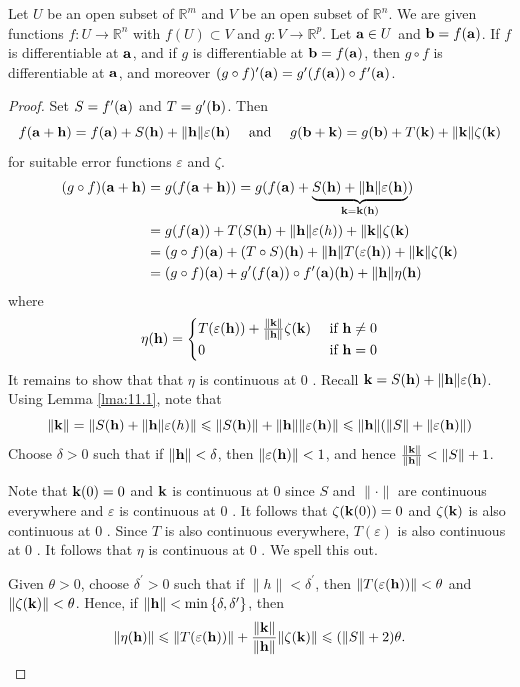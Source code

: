 \documentclass[a4paper,11pt]{article}
\begin{document}
\begin{proposition}
    Let $U$ be an open subset of $\mathbb{R}^{m}$ and $V$ be an open subset of $\mathbb{R}^{n}$. We are given functions $f: U \rightarrow \mathbb{R}^{n}$ with $f(U) \subset V$ and $g: V \rightarrow \mathbb{R}^{p}$. Let ${\bf a} \in U$ and ${\bf b}=f({\bf a})$. If $f$ is differentiable at ${\bf a}$, and if $g$ is differentiable at ${\bf b}=f({\bf a})$, then $g \circ f$ is differentiable at ${\bf a}$, and moreover $(g \circ f)^{\prime}({\bf a})=g^{\prime}(f({\bf a})) \circ f^{\prime}({\bf a})$.
\end{proposition}
\begin{proof}
    Set $S=f^{\prime}({\bf a})$ and $T=g^{\prime}({\bf b})$. Then
$$
f({\bf a}+{\bf h})=f({\bf a})+S({\bf h})+\|{\bf h}\| \varepsilon({\bf h}) \quad \text { and } \quad g({\bf b}+{\bf k})=g({\bf b})+T({\bf k})+\|{\bf k}\| \zeta({\bf k})
$$
for suitable error functions $\varepsilon$ and $\zeta$.
\begin{align*}
    (g \circ f)({\bf a}+{\bf h}) &=g(f({\bf a}+{\bf h}))=g(f({\bf a})+\underbrace{S({\bf h})+\|{\bf h}\| \varepsilon({\bf h})}_{{\bf k}={\bf k}({\bf h})}) \\
    &=g(f({\bf a}))+T(S({\bf h})+\|{\bf h}\| \varepsilon(h))+\|{\bf k}\| \zeta({\bf k}) \\
    &=(g \circ f)({\bf a})+(T \circ S)({\bf h})+\|{\bf h}\| T(\varepsilon({\bf h}))+\|{\bf k}\| \zeta({\bf k}) \\
    &=(g \circ f)({\bf a})+g^{\prime}(f({\bf a})) \circ f^{\prime}({\bf a})({\bf h})+\|{\bf h}\| \eta({\bf h})
    \end{align*}
    where
    \[
        \eta({\bf h})= \begin{cases}T(\varepsilon({\bf h}))+\frac{\|{\bf k}\|}{\|{\bf h}\|} \zeta({\bf k}) & \text { if } {\bf h} \neq 0 \\ 0 & \text { if } {\bf h}=0\end{cases}
    \]
    It remains to show that that $\eta$ is continuous at 0 . Recall ${\bf k}=S({\bf h})+\|{\bf h}\| \varepsilon({\bf h})$. Using Lemma \ref{lma:11.1}, note that
$$
\|{\bf k}\|=\|S({\bf h})+\| {\bf h}\|\varepsilon(h)\| \leqslant\|S({\bf h})\|+\|{\bf h}\|\|\varepsilon({\bf h})\| \leqslant\|{\bf h}\|(\|S\|+\|\varepsilon({\bf h})\|)
$$
Choose $\delta>0$ such that if $\|{\bf h}\|<\delta$, then $\|\varepsilon({\bf h})\|<1$, and hence $\frac{\|{\bf k}\|}{\|{\bf h}\|}<\|S\|+1$.

Note that ${\bf k}(0)=0$ and ${\bf k}$ is continuous at 0 since $S$ and $\|\cdot\|$ are continuous everywhere and $\varepsilon$ is continuous at 0 . It follows that $\zeta({\bf k}(0))=0$ and $\zeta({\bf k})$ is also continuous at 0 . Since $T$ is also continuous everywhere, $T(\varepsilon)$ is also continuous at 0 . It follows that $\eta$ is continuous at 0 . We spell this out.

Given $\theta>0$, choose $\delta^{\prime}>0$ such that if $\|h\|<\delta^{\prime}$, then $\|T(\varepsilon({\bf h}))\|<\theta$ and $\|\zeta({\bf k})\|<\theta$. Hence, if $\|{\bf h}\|<\min \left\{\delta, \delta^{\prime}\right\}$, then
\[
\|\eta({\bf h})\| \leqslant\|T(\varepsilon({\bf h}))\|+\frac{\|{\bf k}\|}{\|{\bf h}\|}\|\zeta({\bf k})\| \leqslant(\|S\|+2) \theta.\qedhere
\]
\end{proof}
\end{document}
